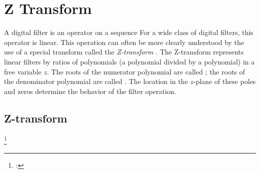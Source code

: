 \chapter{Z Transform}
\label{app:dsp}
\label{app:ztrans}
A digital filter is an operator on a sequence
For a wide class of digital filters, this operator is linear.
This operation can often be more clearly
understood by the use of a special transform called the {\em Z-transform} .
The Z-transform represents linear filters by ratios of polynomials
(a polynomial divided by a polynomial) in a free variable $z$.
The roots of the numerator polynomial are called ;
the roots of the denominator polynomial are called .
The location in the $z$-plane of these poles and zeros
determine the behavior of the filter operation.

\section{Z-transform}
\begin{definition}
\footnote{
  : 
  }
\label{def:opZ}
\end{definition}

